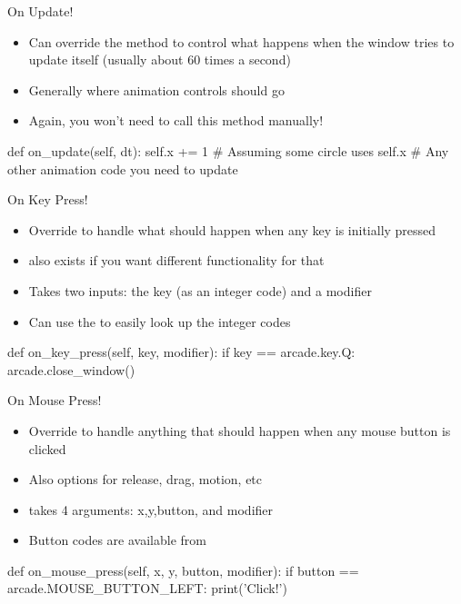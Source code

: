 \documentclass[pdf, aspectratio=169, 12pt]{beamer}
\begin{document}
\begin{frame}[fragile]{On Update!}
	\begin{itemize}
		\item Can override the  method to control what happens when the window tries to update itself (usually about 60 times a second)
		\item Generally where animation controls should go
		\item Again, you won't need to call this method manually!
	\end{itemize}
	\medskip
	\begin{pythoncode}
		def on_update(self, dt):
			self.x += 1 # Assuming some circle uses self.x
			# Any other animation code you need to update
	\end{pythoncode}
\end{frame}

\begin{frame}[fragile]{On Key Press!}
	\begin{itemize}
		\item Override  to handle what should happen when any key is initially pressed
		\item {} also exists if you want different functionality for that
		\item Takes two inputs: the key (as an integer code) and a modifier
		\item Can use the  to easily look up the integer codes
	\end{itemize}
	\medskip
	\begin{pythoncode}
		def on_key_press(self, key, modifier):
			if key == arcade.key.Q:
				arcade.close_window()
	\end{pythoncode}
\end{frame}

\begin{frame}[fragile]{On Mouse Press!}
	\begin{itemize}
		\item Override  to handle anything that should happen when any mouse button is clicked
		\item Also options for release, drag, motion, etc
		\item {} takes 4 arguments: x,y,button, and modifier
		\item Button codes are available from 
	\end{itemize}
	\medskip
	\begin{pythoncode}
		def on_mouse_press(self, x, y, button, modifier):
			if button == arcade.MOUSE_BUTTON_LEFT:
				print('Click!')
	\end{pythoncode}
	
\end{frame}
\end{document}
